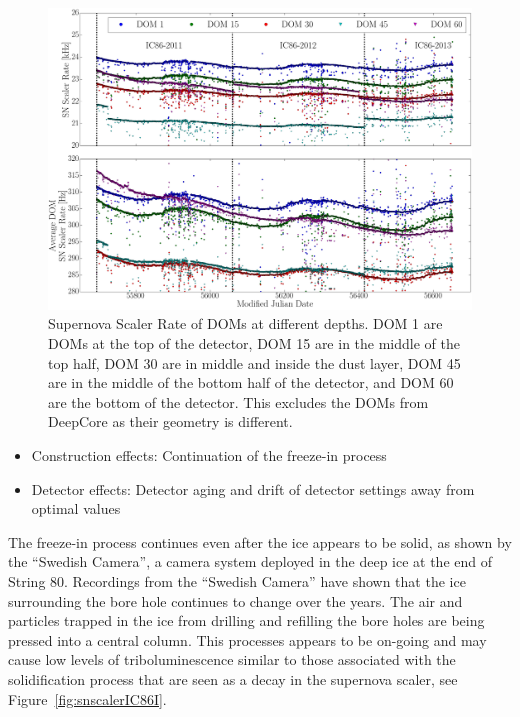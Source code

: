 \begin{figure}[h]
  \begin{center}
    \includegraphics[width=1\textwidth]{./figures/SNScalerRateLayersIC86I_III.png}
  \end{center}
  \caption{Supernova Scaler Rate of DOMs at different depths. DOM 1 are DOMs at the top of the detector, DOM 15 are in the middle of the top half, DOM 30 are in middle and inside the dust layer, DOM 45 are in the middle of the bottom half of the detector, and DOM 60 are the bottom of the detector. This excludes the DOMs from DeepCore as their geometry is different. \label{fig:scalerratedepth}}   
\end{figure}

\begin{itemize}
  \item Construction effects: Continuation of the freeze-in process
  \item Detector effects: Detector aging and drift of detector settings away from optimal values
\end{itemize}

The freeze-in process continues even after the ice appears to be solid, as shown by the ``Swedish Camera'', a camera system deployed in the deep ice at the end of String 80. Recordings from the ``Swedish Camera'' have shown that the ice surrounding the bore hole continues to change over the years. The air and particles trapped in the ice from drilling and refilling the bore holes are being pressed into a central column. This processes appears to be on-going and may cause low levels of triboluminescence similar to those associated with the solidification process that are seen as a decay in the supernova scaler, see Figure~\ref{fig:snscalerIC86I}. 

